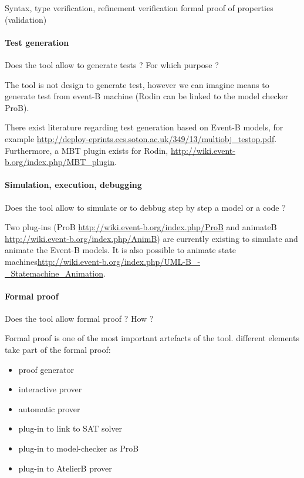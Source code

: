 \begin{author_comment}

Syntax, type verification,
refinement verification
formal proof of properties (validation)
\end{author_comment}

\paragraph{Test generation}
Does the tool allow to generate tests ? For  which purpose ?

\begin{author_comment}

The tool is not design to generate test, however we can imagine means to  generate test from event-B machine (Rodin can be linked to the model checker ProB).
\end{author_comment}

\begin{assessor2}
  There exist literature regarding test generation based on Event-B
  models, for example
  \url{http://deploy-eprints.ecs.soton.ac.uk/349/13/multiobj_testop.pdf}. Furthermore,
  a MBT plugin exists for Rodin,
  \url{http://wiki.event-b.org/index.php/MBT_plugin}.
\end{assessor2}

\paragraph{Simulation, execution, debugging}
Does the tool allow to simulate or to debbug step by step a model or a code ?

\begin{author_comment}

Two plug-ins (ProB \url{http://wiki.event-b.org/index.php/ProB} and animateB \url{http://wiki.event-b.org/index.php/AnimB}) are currently existing to simulate and animate the Event-B models. It is also possible to animate state machines\url{http://wiki.event-b.org/index.php/UML-B_-_Statemachine_Animation}.
\end{author_comment}

\paragraph{Formal proof}
Does the tool allow formal proof ?  How ?

\begin{author_comment}

Formal proof is one of the most important artefacts of the tool. different elements take part of the formal proof:
\begin{itemize}
\item proof generator
\item interactive prover
\item automatic prover
\item plug-in to link to SAT solver
\item plug-in to model-checker as ProB
\item plug-in to AtelierB prover
\end{itemize}
\end{author_comment}


